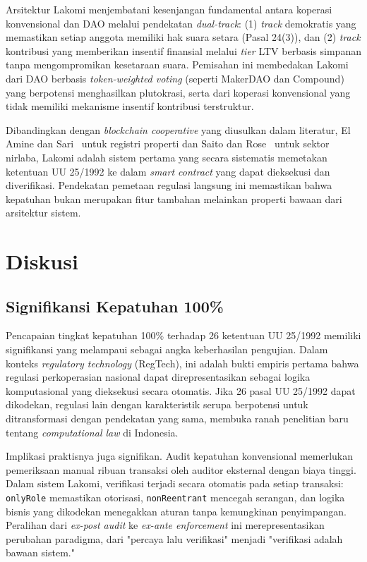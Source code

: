 Arsitektur Lakomi menjembatani kesenjangan fundamental antara koperasi konvensional dan DAO melalui pendekatan \textit{dual-track}: (1) \textit{track} demokratis yang memastikan setiap anggota memiliki hak suara setara (Pasal 24(3)), dan (2) \textit{track} kontribusi yang memberikan insentif finansial melalui \textit{tier} LTV berbasis simpanan tanpa mengompromikan kesetaraan suara. Pemisahan ini membedakan Lakomi dari DAO berbasis \textit{token-weighted voting} (seperti MakerDAO dan Compound) yang berpotensi menghasilkan plutokrasi, serta dari koperasi konvensional yang tidak memiliki mekanisme insentif kontribusi terstruktur.

Dibandingkan dengan \textit{blockchain cooperative} yang diusulkan dalam literatur, El Amine dan Sari~\cite{elamine2024blockchain} untuk registri properti dan Saito dan Rose~\cite{saito2023reputation} untuk sektor nirlaba, Lakomi adalah sistem pertama yang secara sistematis memetakan ketentuan UU 25/1992 ke dalam \textit{smart contract} yang dapat dieksekusi dan diverifikasi. Pendekatan pemetaan regulasi langsung ini memastikan bahwa kepatuhan bukan merupakan fitur tambahan melainkan properti bawaan dari arsitektur sistem.

\section{Diskusi}

\subsection{Signifikansi Kepatuhan 100\%}

Pencapaian tingkat kepatuhan 100\% terhadap 26 ketentuan UU 25/1992 memiliki signifikansi yang melampaui sebagai angka keberhasilan pengujian. Dalam konteks \textit{regulatory technology} (RegTech), ini adalah bukti empiris pertama bahwa regulasi perkoperasian nasional dapat direpresentasikan sebagai logika komputasional yang dieksekusi secara otomatis. Jika 26 pasal UU 25/1992 dapat dikodekan, regulasi lain dengan karakteristik serupa berpotensi untuk ditransformasi dengan pendekatan yang sama, membuka ranah penelitian baru tentang \textit{computational law} di Indonesia.

Implikasi praktisnya juga signifikan. Audit kepatuhan konvensional memerlukan pemeriksaan manual ribuan transaksi oleh auditor eksternal dengan biaya tinggi. Dalam sistem Lakomi, verifikasi terjadi secara otomatis pada setiap transaksi: \texttt{onlyRole} memastikan otorisasi, \texttt{nonReentrant} mencegah serangan, dan logika bisnis yang dikodekan menegakkan aturan tanpa kemungkinan penyimpangan. Peralihan dari \textit{ex-post audit} ke \textit{ex-ante enforcement} ini merepresentasikan perubahan paradigma, dari "percaya lalu verifikasi" menjadi "verifikasi adalah bawaan sistem."

